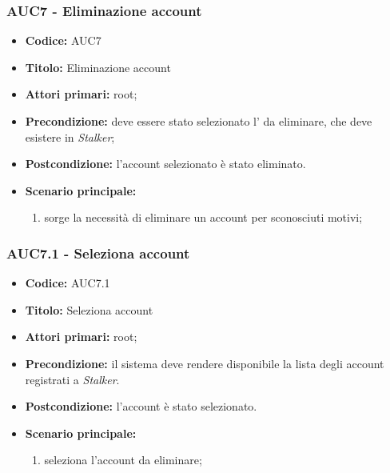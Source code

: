 \documentclass[casi-duso]{subfiles}
\begin{document}
\subsubsection{AUC7 - Eliminazione account}%
\label{subsub:AUC7}
\begin{itemize}
  \item \textbf{Codice:} AUC7
  \item \textbf{Titolo:} Eliminazione account
  \item \textbf{Attori primari:} root;
  \item \textbf{Precondizione:} deve essere stato selezionato l' da eliminare, che deve esistere in \emph{Stalker};
  \item \textbf{Postcondizione:} l'account selezionato è stato eliminato.
  \item \textbf{Scenario principale:}
  \begin{enumerate}
    \item sorge la necessità di eliminare un account per sconosciuti motivi;
  \end{enumerate}
\end{itemize}


\subsubsection{AUC7.1 - Seleziona account}%
\label{subsub:AUC7.1}
\begin{itemize}
  \item \textbf{Codice:} AUC7.1
  \item \textbf{Titolo:} Seleziona account
  \item \textbf{Attori primari:} root;
  \item \textbf{Precondizione:} il sistema deve rendere disponibile la lista degli account registrati a \emph{Stalker}.
  \item \textbf{Postcondizione:} l'account è stato selezionato.
  \item \textbf{Scenario principale:}
  \begin{enumerate}
    \item {} seleziona l'account da eliminare;
  \end{enumerate}
\end{itemize}
\end{document}
